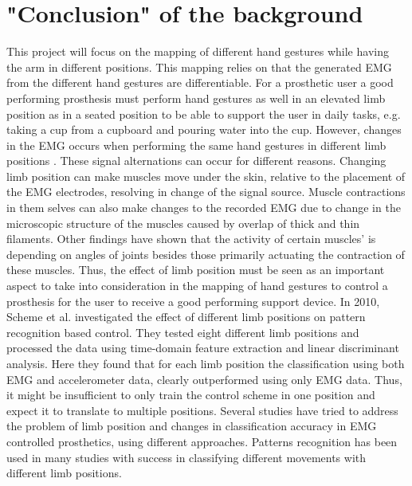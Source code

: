 \section{"Conclusion" of the background}

This project will focus on the mapping of different hand gestures while having the arm in different positions. This mapping relies on that the generated EMG from the different hand gestures are differentiable. For a prosthetic user a good performing prosthesis must perform hand gestures as well in an elevated limb position as in a seated position to be able to support the user in daily tasks, e.g. taking a cup from a cupboard and pouring water into the cup. However, changes in the EMG occurs when performing the same hand gestures in different limb positions \cite{Fougner2011, avella2006}. These signal alternations can occur for different reasons. Changing limb position can make muscles move under the skin, relative to the placement of the EMG electrodes, resolving in change of the signal source. Muscle contractions in them selves can also make changes to the recorded EMG due to change in the microscopic structure of the muscles caused by overlap of thick and thin filaments. \cite{martini}  
Other findings have shown that the activity of certain muscles' is depending on angles of joints besides those primarily actuating the contraction of these muscles. \cite{Fougner2011} Thus, the effect of limb position must be seen as an important aspect to take into consideration in the mapping of hand gestures to control a prosthesis for the user to receive a good performing support device. 
In 2010, Scheme et al. investigated the effect of different limb positions on pattern recognition based control. They tested eight different limb positions and processed the data using time-domain feature extraction and linear discriminant analysis. Here they found that for each limb position the classification using both EMG and accelerometer data, clearly outperformed using only EMG data. Thus, it might be insufficient to only train the control scheme in one position and expect it to translate to multiple positions. \cite{Fougner2010} 
Several studies have tried to address the problem of limb position and changes in classification accuracy in EMG controlled prosthetics, using different approaches. Patterns recognition has been used in many studies with success in classifying different movements with different limb positions. 

